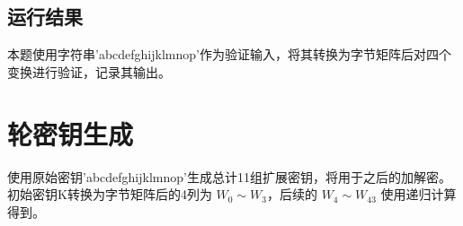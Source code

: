 \documentclass[degree=project,degree-type=project,cjk-font=noto]{thuthesis}
\begin{document}
\subsection{运行结果}

本题使用字符串'abcdefghijklmnop'作为验证输入，将其转换为字节矩阵后对四个变换进行验证，记录其输出。

\section{轮密钥生成}

    使用原始密钥'abcdefghijklmnop'生成总计11组扩展密钥，将用于之后的加解密。初始密钥K转换为字节矩阵后的4列为 $W_0 \sim W_3$，后续的 $W_4 \sim W_{43}$ 使用递归计算得到。
\end{document}
